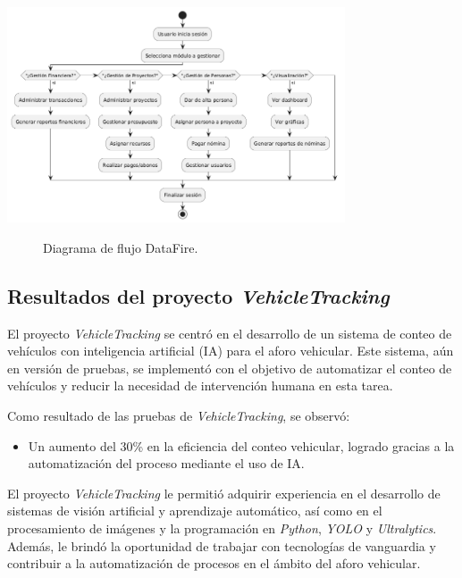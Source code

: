\documentclass[protocolo.tex]{subfiles}
\begin{document}
\begin{center}
\includegraphics[width=0.75\textwidth]{Imagenes/datafireF2.png}
\end{center}
\begin{figure}[h]  %
    \centering
    \caption{Diagrama de flujo DataFire.}
    \label{fig:mi-figura}
\end{figure}



\subsection{Resultados del proyecto \textit{VehicleTracking}}

El proyecto  \textit{VehicleTracking} se centró en el desarrollo de un sistema de conteo de vehículos con inteligencia artificial (IA) para el aforo vehicular.  Este sistema, aún en versión de pruebas, se implementó con el objetivo de automatizar el conteo de vehículos y reducir la necesidad de intervención humana en esta tarea.\vspace{4mm}

Como resultado de las pruebas de \textit{VehicleTracking}, se observó:

\begin{itemize}
\item Un aumento del 30\% en la eficiencia del conteo vehicular,  logrado gracias a la automatización del proceso mediante el uso de IA.
\end{itemize}

El proyecto \textit{VehicleTracking} le permitió adquirir experiencia en el desarrollo de sistemas de visión artificial y aprendizaje automático, así como en el procesamiento de imágenes y la programación en  \textit{Python},  \textit{YOLO} y  \textit{Ultralytics}.  Además, le brindó la oportunidad de trabajar con tecnologías de vanguardia y contribuir a la automatización de procesos en el ámbito del aforo vehicular.
\end{document}
